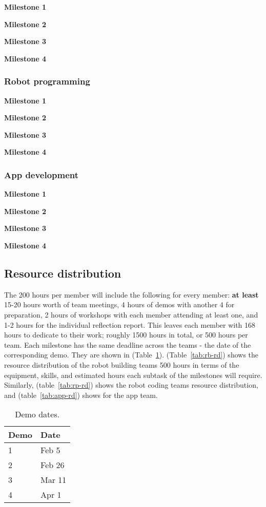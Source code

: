 \documentclass{article}
\begin{document}
{\bf Milestone 1}

{\bf Milestone 2}

{\bf Milestone 3}

{\bf Milestone 4}


\subsubsection{Robot programming}

{\bf Milestone 1}

{\bf Milestone 2}

{\bf Milestone 3}

{\bf Milestone 4}

\subsubsection{App development}

{\bf Milestone 1}

{\bf Milestone 2}

{\bf Milestone 3}

{\bf Milestone 4}


\subsection{Resource distribution}

The 200 hours per member will include the following for every member: {\bf at least} 15-20 hours worth of team meetings, 4 hours of demos with another 4 for preparation, 2 hours of workshops with each member attending at least one, and 1-2 hours for the individual reflection report. This leaves each member with 168 hours to dedicate to their work; roughly 1500 hours in total, or 500 hours per team. Each milestone has the same deadline across the teams - the date of the corresponding demo. They are shown in (Table~\ref{tab:demo-dates}). (Table~\ref{tab:rb-rd}) shows the resource distribution of the robot building teams 500 hours in terms of the equipment, skills, and estimated hours each subtask of the milestones will require. Similarly, (table~\ref{tab:rp-rd}) shows the robot coding teams resource distribution, and (table~\ref{tab:app-rd}) shows for the app team.
\begin{table}[]
  \begin{center}
  \begin{tabular}{ll}
    \hline
    Demo & Date   \\
    \hline
    1 & Feb 5 \\
    2 & Feb 26 \\
    3 & Mar 11 \\
    4 & Apr 1\\ \hline
  \end{tabular}
  \end{center}
  \caption{Demo dates.}
  \label{tab:demo-dates}
\end{table}
\end{document}
